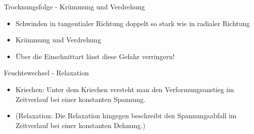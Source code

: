 \documentclass[fleqn,twoside]{article}
\begin{document}
        Trocknungsfolge - Krümmung und Verdrehung
            \begin{itemize}
                \item Schwinden in tangentialer Richtung doppelt so stark wie in radialer Richtung
                \item Krümmung und Verdrehung
                \item Über die Einschnittart lässt diese Gefahr verringern!
            \end{itemize}

        Feuchtewechsel - Relaxation
            \begin{itemize}
                \item Kriechen: Unter dem Kriechen versteht man den Verformungsanstieg im Zeitverlauf bei einer konstanten Spannung.
                \item (Relaxation: Die Relaxation hingegen beschreibt den Spannungsabfall im Zeitverlauf bei einer konstanten Dehnung.)
            \end{itemize}
\end{document}
